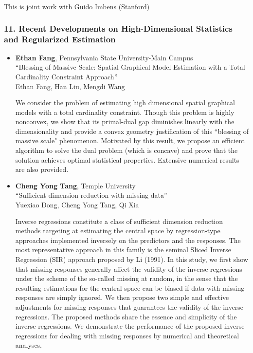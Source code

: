 \begin{itemize}
This is joint work with Guido Imbens (Stanford)

\end{itemize}

\subsubsection*{11. Recent Developments on High-Dimensional Statistics and Regularized Estimation}

\begin{itemize}
\item \textbf{Ethan Fang}, Pennsylvania State University-Main Campus \\
``Blessing of Massive Scale: Spatial Graphical Model  Estimation with a Total Cardinality Constraint Approach'' \\
Ethan Fang, Han Liu, Mengdi Wang


We consider the problem of estimating high dimensional spatial graphical models with a total cardinality constraint. Though this problem is highly nonconvex, we show that its primal-dual gap diminishes linearly with the dimensionality and provide a convex geometry justification of this ``blessing of massive scale" phenomenon. Motivated by this result, we propose an efficient algorithm to solve the dual problem (which is concave) and prove that the solution achieves optimal statistical properties. Extensive numerical results are also provided.

\item \textbf{Cheng Yong Tang}, Temple University \\
``Sufficient dimension reduction with missing data'' \\
Yuexiao Dong, Cheng Yong Tang, Qi Xia


Inverse regressions constitute a class of sufficient dimension reduction methods targeting at estimating the central space by regression-type approaches implemented inversely on the predictors and the responses. The most representative approach in this family is the seminal Sliced Inverse Regression (SIR) approach proposed by Li (1991). In this study, we first show that missing responses generally affect the validity of the inverse regressions under the scheme of the so-called missing at random, in the sense that the resulting estimations for the central space can be biased if data with missing responses are simply ignored.  We then propose two simple and effective adjustments for missing responses that guarantees the validity of the inverse regressions. The proposed methods share the essence and simplicity of the inverse regressions. We demonstrate the performance of the proposed inverse regressions for dealing with missing responses by numerical and theoretical analyses. 


\end{itemize}
